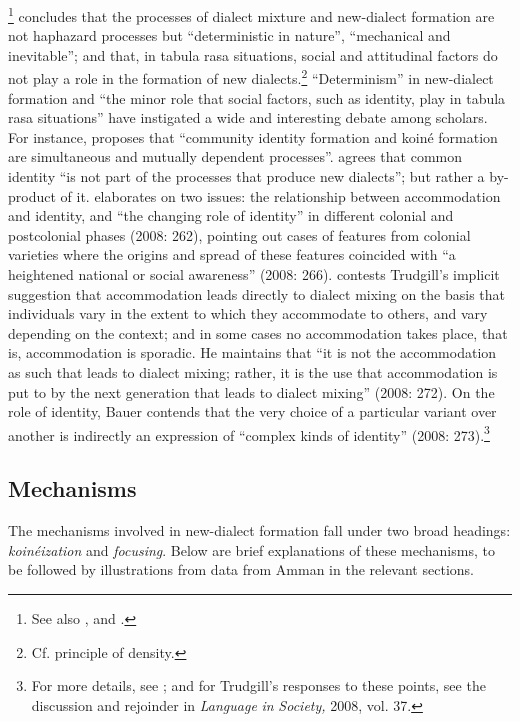 \documentclass[output=paper]{langsci/langscibook}
\begin{document}
\citet[149]{Trudgill2004}\footnote{See also \citet{TrudgillEtAl2000}, and \citet{Trudgill2008}.} concludes that the processes of dialect mixture and new-dialect formation are not haphazard processes but “deterministic in nature”, “mechanical and inevitable”; and that, in tabula rasa situations, social and attitudinal factors do not play a role in the formation of new dialects.\footnote{Cf.  principle of density.} “Determinism” in new-dialect formation and “the minor role that social factors, such as identity, play in tabula rasa situations” have instigated a wide and interesting debate among scholars. For instance, \citet[261]{Tuten2008} proposes that “community identity formation and koiné formation are simultaneous and mutually dependent processes”. \citet[258]{Mufwene2008} agrees that common identity “is not part of the processes that produce new dialects”; but rather a by-product of it. \citet{Schneider2008} elaborates on two issues: the relationship between accommodation and identity, and “the changing role of identity” in different colonial and postcolonial phases (2008: 262), pointing out cases of features from colonial varieties where the origins and spread of these features coincided with “a heightened national or social awareness” (2008: 266). \citet{Bauer2008} contests Trudgill’s implicit suggestion that accommodation leads directly to dialect mixing on the basis that individuals vary in the extent to which they accommodate to others, and vary depending on the context; and in some cases no accommodation takes place, that is, accommodation is sporadic. He maintains that “it is not the accommodation as such that leads to dialect mixing; rather, it is the use that accommodation is put to by the next generation that leads to dialect mixing” (2008: 272). On the role of identity, Bauer contends that the very choice of a particular variant over another is indirectly an expression of “complex kinds of identity” (2008: 273).\footnote{For more details, see \citet{Bauer2008}; and for Trudgill’s responses to these points, see the discussion and rejoinder in \textit{Language} \textit{in} \textit{Society,} 2008, vol. 37.}

\subsection{Mechanisms}

The mechanisms involved in new-dialect formation fall under two broad headings: \textit{koinéization} and \textit{focusing}. Below are brief explanations of these mechanisms, to be followed by illustrations from data from Amman in the relevant sections.
\end{document}
